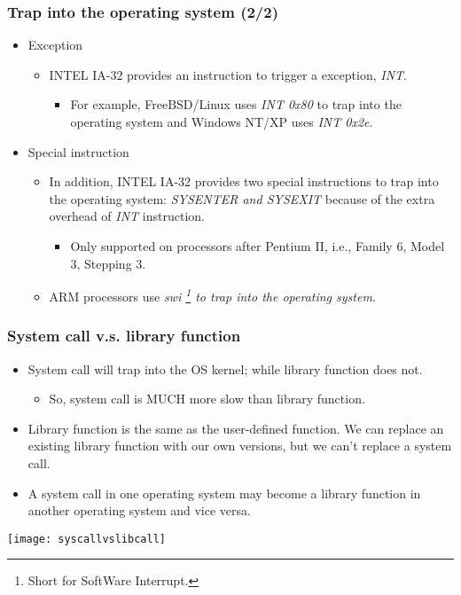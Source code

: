 \documentclass[CJKutf8,dvipsnames,table]{beamer}
\begin{document}
\begin{CJK*}{UTF8}{song}
  \begin{frame}
    \frametitle{Trap into the operating system (2/2)} \pause
    \begin{itemize}
    \item Exception  \pause
      \begin{itemize}
      \item INTEL IA-32 provides an instruction to trigger a exception, \emph{INT}.  \pause
        \begin{itemize}
        \item For example, FreeBSD/Linux uses \emph{INT 0x80} to trap into the operating system and Windows NT/XP uses \emph{INT 0x2e}.  \pause
        \end{itemize}
      \end{itemize}
    \item Special instruction  \pause
      \begin{itemize}
      \item In addition, INTEL IA-32 provides two special instructions to trap into the operating system: \emph{SYSENTER and SYSEXIT} because of the extra overhead of \emph{INT} instruction.  \pause
        \begin{itemize}
        \item Only supported on processors after Pentium II, i.e., Family 6, Model 3, Stepping 3.  \pause
        \end{itemize}
      \item ARM processors use \emph{swi  \footnote{Short for SoftWare
        Interrupt.} to trap into the operating system.}
      \end{itemize}
    \end{itemize}
  \end{frame}

  \begin{frame}
    \frametitle{System call v.s. library function} \pause
    \begin{itemize}
    \item System call will trap into the OS kernel; while library function does not.  \pause
      \begin{itemize}
      \item So, system call is MUCH more slow than library function.  \pause
      \end{itemize}
    \item Library function is the same as the user-defined function. We can replace an existing library function with our own versions, but we can't replace a system call.  \pause
    \item A system call in one operating system may become a library function in another operating system and vice versa.  \pause
    \end{itemize}
    \begin{center}
      \texttt{[image: syscallvslibcall]}
    \end{center}
  \end{frame}


\end{CJK*}
\end{document}
